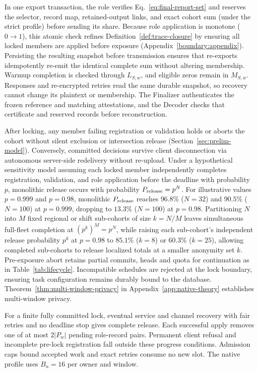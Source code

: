 \documentclass[conference,compsoc]{IEEEtran}
\theoremstyle{definition}
\numberwithin{equation}{section}
\numberwithin{table}{section}
\numberwithin{figure}{section}
\theoremstyle{plain}
\begin{document}
In one export transaction, the role verifies Eq.~\eqref{eq:final-report-set} and reserves the
selector, record map, retained-output links, and exact cohort sum
(\label{sec:profiles}\label{sec:dp}under the strict profile) before sending its share.
Because role application is monotone (\(0 \to 1\)), this atomic check refines
Definition~\ref{def:trace-closure} by ensuring all locked members are applied before exposure (Appendix~\ref{boundary:appendix}).
Persisting the resulting snapshot before transmission ensures that re-exports idempotently
re-emit the identical complete sum without altering membership. Warmup completion is checked
through \(L_{S,w}\), and eligible zeros remain in \(M_{S,w}\). Responses and re-encrypted retries
read the same durable snapshot, so recovery cannot change its plaintext or
membership. The Finalizer authenticates the frozen reference and matching attestations, and
the Decoder checks that certificate and reserved records before reconstruction.

After locking, any member failing registration or validation holds or aborts the
cohort without silent exclusion or intersection release (Section~\ref{sec:prelim-model}).
Conversely, committed decisions survive client disconnection via autonomous
server-side redelivery without re-upload. Under a hypothetical sensitivity model assuming each locked member independently completes registration, validation, and role application before the deadline with probability \(p\), monolithic release occurs with probability \(P_{\rm release} = p^N\).
For illustrative values \(p = 0.999\) and \(p = 0.98\), monolithic \(P_{\rm release}\) reaches \(96.8\%\) (\(N=32\)) and \(90.5\%\) (\(N=100\)) at \(p = 0.999\), dropping to \(13.3\%\) (\(N=100\)) at \(p = 0.98\).
Partitioning \(N\) into \(M\) fixed regional or shift sub-cohorts of size \(k = N/M\) leaves simultaneous full-fleet completion at \((p^k)^M = p^N\), while raising each sub-cohort's independent release probability \(p^k\) at \(p = 0.98\) to \(85.1\%\) (\(k=8\)) or \(60.3\%\) (\(k=25\)), allowing completed sub-cohorts to release localized totals at a smaller anonymity set \(k\).
Pre-exposure abort retains partial commits, heads and quota for continuation as in Table~\ref{tab:lifecycle}.
Incompatible schedules are rejected at the lock boundary, ensuring task configuration remains durably bound to the database. Theorem~\ref{thm:multi-window-privacy} in Appendix~\ref{app:native-theory} establishes multi-window privacy.

\label{prop:native-post-admission-progress}
For a finite fully committed lock, eventual service and channel recovery with
fair retries and no deadline stop gives complete release. Each successful apply
removes one of at most \(2|P_w|\) pending role-record pairs. Permanent client refusal and incomplete pre-lock registration fall outside
these progress conditions. Admission caps bound accepted work and exact retries
consume no new slot. The native profile uses \(B_u=16\) per owner and window.
\end{document}
